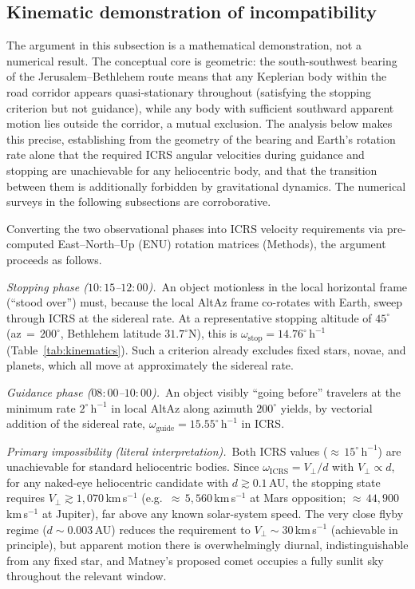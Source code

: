\documentclass[sn-nature]{sn-jnl}
\begin{document}
\subsection{Kinematic demonstration of incompatibility}\label{subsec:kinematic}

The argument in this subsection is a mathematical demonstration, not a numerical
result. The conceptual core is geometric: the south-southwest bearing of the
Jerusalem--Bethlehem route means that any Keplerian body within the road
corridor appears quasi-stationary throughout (satisfying the stopping criterion
but not guidance), while any body with sufficient southward apparent motion
lies outside the corridor, a mutual exclusion. The analysis below makes this
precise, establishing from the geometry of the bearing and Earth's rotation
rate alone that the required ICRS angular velocities during guidance and
stopping are unachievable for any heliocentric body, and that the transition
between them is additionally forbidden by gravitational dynamics. The numerical
surveys in the following subsections are corroborative.

Converting the two observational phases into ICRS velocity requirements via
pre-computed East--North--Up (ENU) rotation matrices (Methods), the argument
proceeds as follows.

\textit{Stopping phase ($10{:}15$--$12{:}00$).}~An object motionless in the
local horizontal frame (``stood over'') must, because the local AltAz
frame co-rotates with Earth, sweep through ICRS at the sidereal rate.
At a representative stopping altitude of $45^\circ$ (az\,$=\,200^\circ$,
Bethlehem latitude $31.7^\circ$N), this is $\omega_\mathrm{stop} = 14.76^\circ\,\mathrm{h}^{-1}$
(Table~\ref{tab:kinematics}). Such a criterion already excludes fixed stars, novae, and planets, 
which all move at approximately the sidereal rate.

\textit{Guidance phase ($08{:}00$--$10{:}00$).}~An object visibly ``going before''
travelers at the minimum rate $2^\circ\,\mathrm{h}^{-1}$ in local AltAz
along azimuth $200^\circ$ yields, by vectorial addition of the sidereal rate,
$\omega_\mathrm{guide} = 15.55^\circ\,\mathrm{h}^{-1}$ in ICRS.

\textit{Primary impossibility (literal interpretation).}~Both ICRS values
(${\approx}\,15^\circ\,\mathrm{h}^{-1}$) are unachievable for standard heliocentric bodies.
Since $\omega_\mathrm{ICRS} = V_\perp/d$ with $V_\perp \propto d$, for any
naked-eye heliocentric candidate with $d \gtrsim 0.1$\,AU, the stopping
state requires $V_\perp \gtrsim 1{,}070$\,km\,s$^{-1}$ (e.g.\ ${\approx}\,5{,}560$\,km\,s$^{-1}$
at Mars opposition; ${\approx}\,44{,}900$\,km\,s$^{-1}$ at Jupiter), far above any known
solar-system speed. The very close flyby regime ($d\!\sim\!0.003$\,AU) reduces
the requirement to $V_\perp\!\sim\!30$\,km\,s$^{-1}$ (achievable in principle),
but apparent motion there is overwhelmingly diurnal, indistinguishable from any
fixed star, and Matney's proposed comet occupies a fully sunlit sky throughout
the relevant window.
\end{document}
